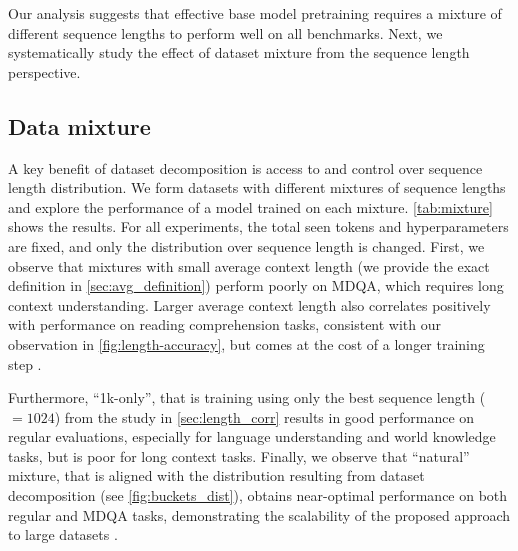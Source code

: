 Our analysis suggests that effective base model pretraining requires a mixture of different sequence lengths to perform well on all benchmarks. Next, we systematically study the effect of dataset mixture from the sequence length perspective.
\subsection{Data mixture}\label{sec:mixture}
\begin{table}[t]
    
\end{table}
A key benefit of dataset decomposition is access to and control over sequence length distribution. We form datasets with different mixtures of sequence lengths and explore the performance of a model trained on each mixture. \cref{tab:mixture} shows the results. For all experiments, the total seen tokens and hyperparameters are fixed, and only the distribution over sequence length is changed. First, we observe that mixtures with small average context length (we provide the exact definition in \cref{sec:avg_definition}) perform poorly on MDQA, which requires long context understanding.  Larger average context length  also correlates positively with performance on reading comprehension tasks, consistent with our observation in \cref{fig:length-accuracy}, but comes at the cost of a longer training step .


Furthermore, ``1k-only'', that is training using only the best sequence length ($=1024$) from the study in \cref{sec:length_corr} results in good performance on regular evaluations, especially for language understanding and world knowledge tasks, but is poor for long context tasks. Finally, we observe that ``natural'' mixture, that is aligned with the distribution resulting from dataset decomposition (see \cref{fig:buckets_dist}), obtains near-optimal performance on both regular and MDQA tasks, demonstrating the scalability of the proposed approach to large datasets .

